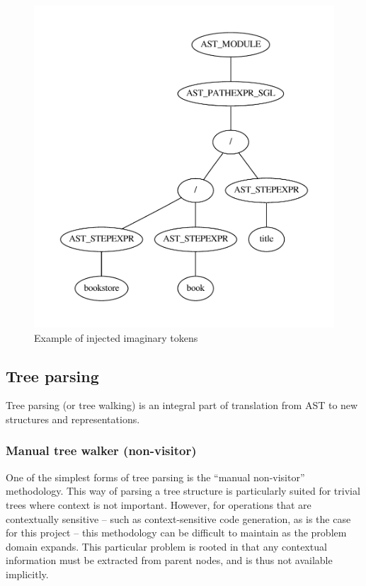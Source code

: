 \begin{figure}[h]
  \centering
    \includegraphics[scale=0.50]{img/graphs/path1} 
  \caption{Example of injected imaginary tokens}
  \label{figure:parser:imaginary_tokens_path}
\end{figure}

\subsection{Tree parsing}
Tree parsing (or tree walking) is an integral part of translation from AST to
new structures and representations. 

\subsubsection{Manual tree walker (non-visitor)}
\label{sect:theory:manual_walker}
One of the simplest forms of tree parsing is the ``manual non-visitor''
methodology. This way of parsing a tree structure is particularly suited for
trivial trees where context is not important. However, for operations that are
contextually sensitive -- such as context-sensitive code generation, as is the
case for this project -- this methodology can be difficult to maintain as the
problem domain expands. This particular problem is rooted in that any
contextual information must be extracted from parent nodes, and is thus not
available implicitly.


